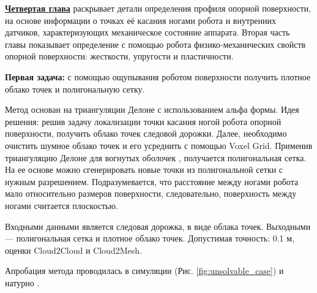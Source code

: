 
\textbf{\underline{Четвертая глава}} раскрывает детали определения профиля опорной поверхности, на основе информации о точках её касания ногами робота и внутренних датчиков, характеризующих механическое состояние аппарата. Вторая часть главы показывает определение с помощью робота физико-механических свойств опорной поверхности:
жесткости, упругости и пластичности.

\textbf{Первая задача:} с помощью ощупывания роботом поверхности получить плотное облако точек и полигональную сетку. 

Метод основан на триангуляции Делоне с использованием альфа формы. Идея решения: решив задачу локализации точки касания ногой робота опорной поверхности, получить облако точек следовой дорожки. Далее, необходимо очистить шумное облако точек и его усреднить с помощью Voxel Grid. Применив триангуляцию Делоне для вогнутых оболочек , получается полигональная сетка. На ее основе можно сгенерировать новые точки из полигональной сетки с нужным разрешением. Подразумевается, что расстояние между ногами робота мало относительно размеров поверхности, следовательно, поверхность между ногами считается плоскостью.

Входными данными является следовая дорожка, в виде облака точек. Выходными --- полигональная сетка и плотное облако точек. Допустимая точность: 0.1 м, оценки Cloud2Cloud и Cloud2Mesh.

Апробация метода проводилась в симуляции (Рис. \ref{fig:unsolvable_case}) и натурно .





